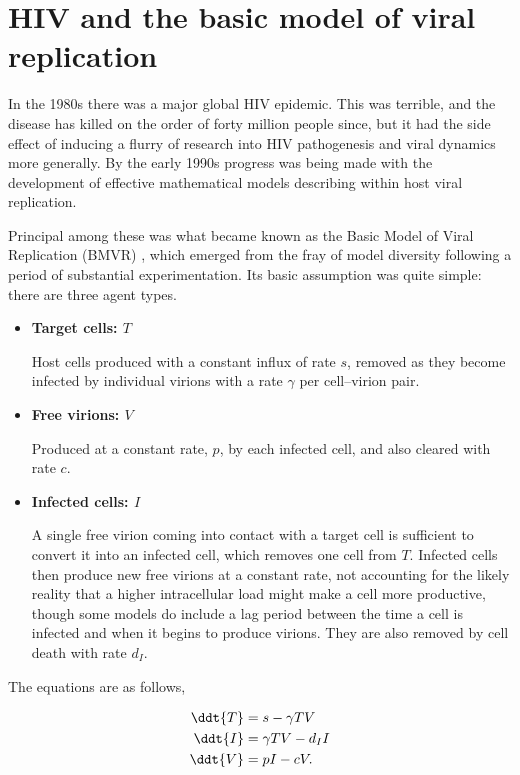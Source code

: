 \section{HIV and the basic model of viral replication}

In the 1980s there was a major global HIV epidemic. This was terrible, and the
disease has killed on the order of forty million people since, but it had the
side effect of inducing a flurry of research into HIV pathogenesis and viral
dynamics more generally. By the early 1990s progress was being made with the
development of effective mathematical models describing within host viral
replication.

Principal among these was what became known as the Basic Model of Viral
Replication (BMVR)
\cite{mclean1993balance,perelson1996hiv,nowak1996population}, which emerged
from the fray of model diversity following a period of substantial
experimentation. Its basic assumption was quite simple: there are three agent
types.

\begin{itemize}
\item \textbf{Target cells: $T$}

Host cells produced with a constant influx of rate $s$, removed as they become
infected by individual virions with a rate $\gamma$ per cell--virion pair.

\item \textbf{Free virions: $V$}

Produced at a constant rate, $p$, by each infected cell, and also cleared with
rate $c$.

\item \textbf{Infected cells: $I$}

A single free virion coming into contact with a target cell is sufficient to
convert it into an infected cell, which removes one cell from $T$. Infected
cells then produce new free virions at a constant rate, not accounting for the
likely reality that a higher intracellular load might make a cell more
productive, though some models do include a lag period between the time a cell
is infected and when it begins to produce virions. They are also removed by
cell death with rate $d_I$.
\end{itemize}

\noindent
The equations are as follows,

\begin{align*}
\ddt{T} & = s - \gamma T V\\
\ddt{I} & = \gamma T V - d_I I\\
\ddt{V}& = p I - c V.
\end{align*}

